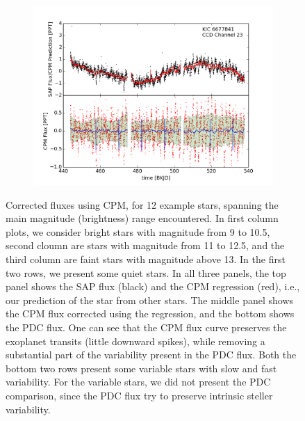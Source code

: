 \documentclass[12pt, preprint]{aastex}
\newcommand{\name}{CPM}
\begin{document}
\begin{figure}[htb]
\begin{subfigure}[htb]{0.33\textwidth}
\end{subfigure}%
\hfill
\begin{subfigure}[htb]{0.33\textwidth}
\includegraphics[width=\textwidth]{kic_6677841}
\end{subfigure}

\caption{\label{fluxes} Corrected fluxes using \name, for 12 example stars, spanning the main magnitude (brightness) range encountered. 
In first column plots,   we consider bright stars with magnitude from 9 to 10.5, second cloumn are stars with magnitude from 11 to 12.5,  
and the third column are faint stars with magnitude above 13. In the first two rows, we present some quiet stars. 
In all three panels, the top panel shows the SAP flux (black) and the CPM regression (red), i.e., our prediction of the star from other stars. 
The middle panel shows the CPM flux corrected using the regression, and the bottom shows the PDC flux. 
One can see that the CPM flux curve preserves the exoplanet transits (little downward spikes), 
while removing a substantial part of the variability present in the PDC flux. 
Both the bottom two rows present some variable stars with slow and fast variability. 
For the variable stars, we did not present the PDC comparison, since the PDC flux try to preserve intrinsic steller variability.}
\end{figure}
\end{document}
